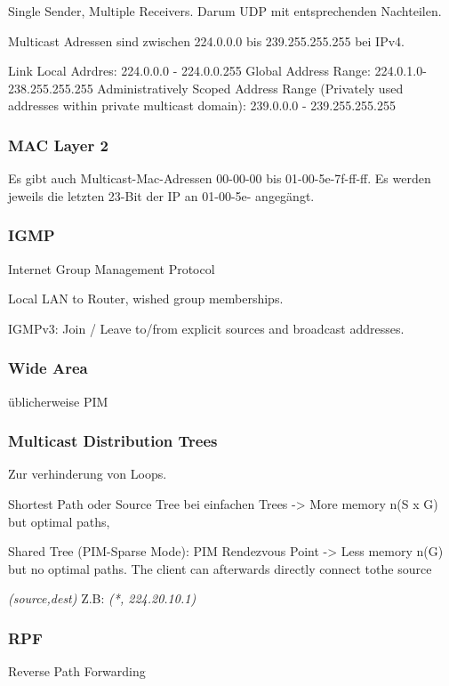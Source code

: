 Single Sender, Multiple Receivers. Darum UDP mit entsprechenden Nachteilen.


Multicast Adressen sind zwischen 224.0.0.0 bis 239.255.255.255 bei IPv4.

Link Local Adrdres: 224.0.0.0 - 224.0.0.255
Global Address Range: 224.0.1.0-238.255.255.255
Administratively Scoped Address Range (Privately used addresses within private multicast domain): 239.0.0.0 - 239.255.255.255

\subsubsection{MAC Layer 2}
	Es gibt auch Multicast-Mac-Adressen 00-00-00 bis 01-00-5e-7f-ff-ff.
	Es werden jeweils die letzten 23-Bit der IP an 01-00-5e- angegängt.

\subsubsection{IGMP}

Internet Group Management Protocol

Local LAN to Router, wished group memberships.

IGMPv3: Join / Leave to/from explicit sources and broadcast addresses.

\subsubsection{Wide Area}
üblicherweise PIM

\subsubsection{Multicast Distribution Trees}

Zur verhinderung von Loops.

Shortest Path oder Source Tree bei einfachen Trees
-> More memory n(S x G) but optimal paths,


Shared Tree (PIM-Sparse Mode): PIM Rendezvous Point 
-> Less memory n(G) but no optimal paths. The client can afterwards directly connect tothe source

\emph{(source,dest)}
Z.B: \emph{(*, 224.20.10.1)}

\subsubsection{RPF}

Reverse Path Forwarding

